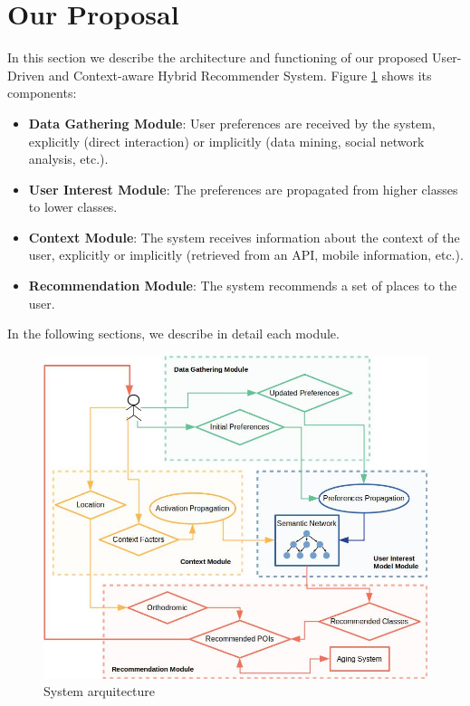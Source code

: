 \section{Our Proposal}
\label{sec:proposal}

In this section we describe the architecture and functioning of our proposed User-Driven and Context-aware Hybrid Recommender System. Figure \ref{fig:arquitecture} shows its components:
\begin{itemize}
    \item \textbf{Data Gathering Module}: User preferences are received by the system, explicitly (direct interaction) or implicitly (data mining, social network analysis, etc.).
    \item \textbf{User Interest Module}: The preferences are propagated from higher classes to lower classes.
    \item \textbf{Context Module}: The system receives information about the context of the user, explicitly or implicitly (retrieved from an API, mobile information, etc.).
    \item \textbf{Recommendation Module}: The system recommends a set of places to the user.
\end{itemize}

In the following sections, we describe in detail each module.

\begin{figure}[h]
\centering
\includegraphics[scale=0.4]{draws/arquitecture.jpg}
\caption{System arquitecture}
\label{fig:arquitecture}
\end{figure}

